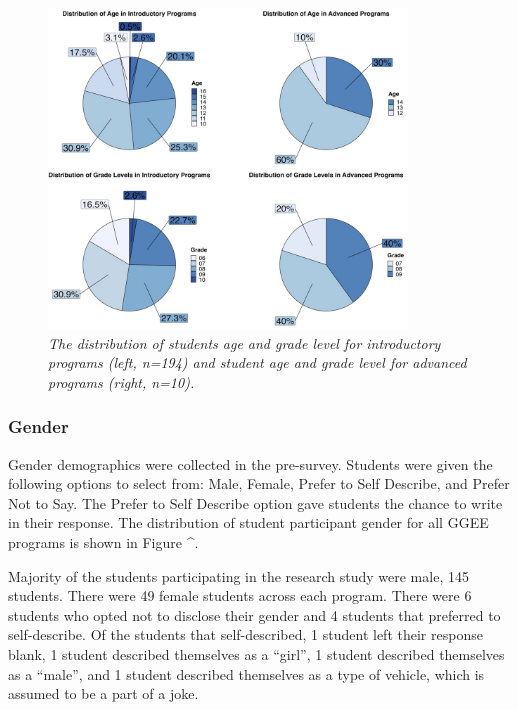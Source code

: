 \documentclass[
]{article}
\begin{document}
\begin{figure}
\centering
\includegraphics[width=0.85\textwidth,height=\textheight]{Graphs/Report/GGEE_23_AgeGrade_IA.jpg}
\caption{\emph{The distribution of students age and grade level for
introductory programs (left, n=194) and student age and grade level for
advanced programs (right, n=10).}}
\end{figure}

\hypertarget{gender}{%
\subsubsection{Gender}\label{gender}}

Gender demographics were collected in the pre-survey. Students were
given the following options to select from: Male, Female, Prefer to Self
Describe, and Prefer Not to Say. The Prefer to Self Describe option gave
students the chance to write in their response. The distribution of
student participant gender for all GGEE programs is shown in Figure
\^{}.

Majority of the students participating in the research study were male,
145 students. There were 49 female students across each program. There
were 6 students who opted not to disclose their gender and 4 students
that preferred to self-describe. Of the students that self-described, 1
student left their response blank, 1 student described themselves as a
``girl'', 1 student described themselves as a ``male'', and 1 student
described themselves as a type of vehicle, which is assumed to be a part
of a joke.
\end{document}
